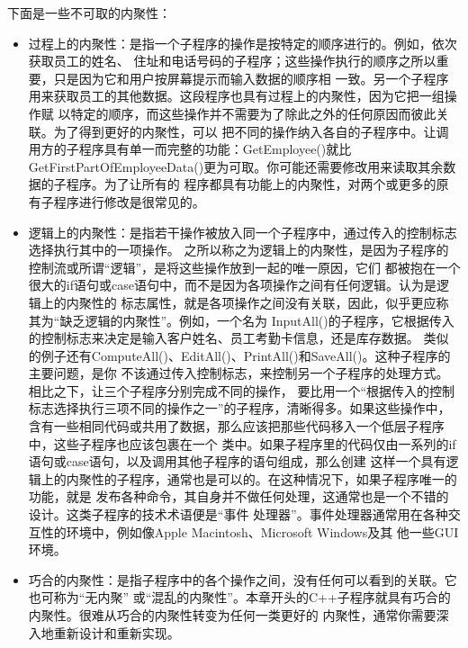 \documentclass{article}
\begin{document}
下面是一些不可取的内聚性：
\begin{itemize}
    \item 过程上的内聚性：是指一个子程序的操作是按特定的顺序进行的。例如，依次获取员工的姓名、
    住址和电话号码的子程序；这些操作执行的顺序之所以重要，只是因为它和用户按屏幕提示而输入数据的顺序相
    一致。另一个子程序用来获取员工的其他数据。这段程序也具有过程上的内聚性，因为它把一组操作赋
    以特定的顺序，而这些操作并不需要为了除此之外的任何原因而彼此关联。为了得到更好的内聚性，可以
    把不同的操作纳入各自的子程序中。让调用方的子程序具有单一而完整的功能：GetEmployee()就比
    GetFirstPartOfEmployeeData()更为可取。你可能还需要修改用来读取其余数据的子程序。为了让所有的
    程序都具有功能上的内聚性，对两个或更多的原有子程序进行修改是很常见的。
    \item 逻辑上的内聚性：是指若干操作被放入同一个子程序中，通过传入的控制标志选择执行其中的一项操作。
    之所以称之为逻辑上的内聚性，是因为子程序的控制流或所谓“逻辑”，是将这些操作放到一起的唯一原因，它们
    都被抱在一个很大的if语句或case语句中，而不是因为各项操作之间有任何逻辑。认为是逻辑上的内聚性的
    标志属性，就是各项操作之间没有关联，因此，似乎更应称其为“缺乏逻辑的内聚性”。例如，一个名为
    InputAll()的子程序，它根据传入的控制标志来决定是输入客户姓名、员工考勤卡信息，还是库存数据。
    类似的例子还有ComputeAll()、EditAll()、PrintAll()和SaveAll()。这种子程序的主要问题，是你
    不该通过传入控制标志，来控制另一个子程序的处理方式。相比之下，让三个子程序分别完成不同的操作，
    要比用一个“根据传入的控制标志选择执行三项不同的操作之一”的子程序，清晰得多。如果这些操作中，
    含有一些相同代码或共用了数据，那么应该把那些代码移入一个低层子程序中，这些子程序也应该包裹在一个
    类中。如果子程序里的代码仅由一系列的if语句或case语句，以及调用其他子程序的语句组成，那么创建
    这样一个具有逻辑上的内聚性的子程序，通常也是可以的。在这种情况下，如果子程序唯一的功能，就是
    发布各种命令，其自身并不做任何处理，这通常也是一个不错的设计。这类子程序的技术术语便是“事件
    处理器”。事件处理器通常用在各种交互性的环境中，例如像Apple Macintosh、Microsoft Windows及其
    他一些GUI环境。
    \item 巧合的内聚性：是指子程序中的各个操作之间，没有任何可以看到的关联。它也可称为“无内聚”
    或“混乱的内聚性”。本章开头的C++子程序就具有巧合的内聚性。很难从巧合的内聚性转变为任何一类更好的
    内聚性，通常你需要深入地重新设计和重新实现。
\end{itemize}
\end{document}
